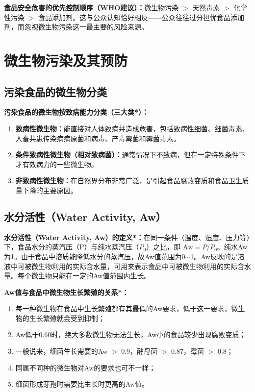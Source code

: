 \begin{tipbox}
\textbf{食品安全危害的优先控制顺序（WHO建议）：}微生物污染 $>$ 天然毒素 $>$ 化学性污染 $>$ 食品添加剂。这与公众认知恰好相反——公众往往过分担忧食品添加剂，而忽视微生物污染这一最主要的风险来源。
\end{tipbox}

\section{微生物污染及其预防}

\subsection{污染食品的微生物分类}

\begin{keybox}
\textbf{污染食品的微生物按致病能力分类（三大类*）：}

\begin{enumerate}[leftmargin=*]
    \item \textbf{致病性微生物：}能直接对人体致病并造成危害，包括致病性细菌、细菌毒素、人畜共患传染病病原菌和病毒、产毒霉菌和霉菌毒素。
    \item \textbf{条件致病性微生物（相对致病菌）：}通常情况下不致病，但在一定特殊条件下才有效病力的一些微生物。
    \item \textbf{非致病性微生物：}在自然界分布非常广泛，是引起食品腐败变质和食品卫生质量下降的主要原因。
\end{enumerate}
\end{keybox}

\subsection{水分活性（Water Activity, Aw）}

\begin{keybox}
\textbf{水分活性（Water Activity, Aw）的定义*：}在同一条件（温度、湿度、压力等）下，食品水分的蒸汽压（P）与纯水蒸汽压（$P_0$）之比，即 $\text{Aw} = P/P_0$。纯水Aw为1。由于食品中溶质能降低水分的蒸汽压，故Aw值范围为0$\sim$1。Aw反映的是溶液中可被微生物利用的实际含水量，可用来表示食品中可被微生物利用的实际含水量。每个微生物只能在一定的Aw值范围内生长。

\textbf{Aw值与食品中微生物生长繁殖的关系*：}
\begin{enumerate}[leftmargin=*]
    \item 每一种微生物在食品中生长繁殖都有其最低的Aw要求，低于这一要求，微生物的生长繁殖就会受到抑制；
    \item Aw低于0.60时，绝大多数微生物无法生长，Aw小的食品较少出现腐败变质；
    \item 一般说来，细菌生长需要的Aw $>$ 0.9，酵母菌 $>$ 0.87，霉菌 $>$ 0.8；
    \item 同属不同种的微生物对Aw的要求也可不一样；
    \item 细菌形成芽孢时需要比生长时更高的Aw值。
\end{enumerate}
\end{keybox}

